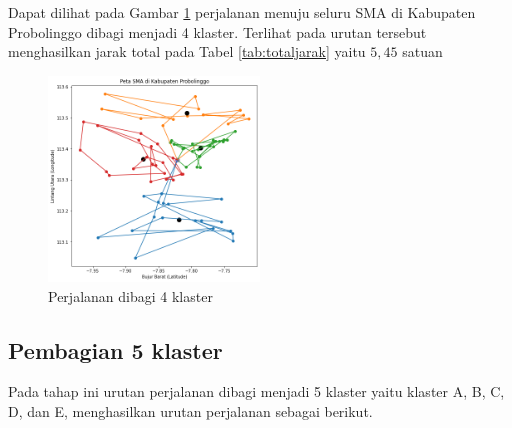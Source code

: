 Dapat dilihat pada Gambar \ref{fig:hasil_mtsp4} perjalanan menuju seluru SMA di Kabupaten Probolinggo dibagi menjadi 4 klaster. Terlihat pada urutan tersebut menghasilkan jarak total pada Tabel \ref{tab:totaljarak} yaitu $5,45$ satuan

\begin{figure}[H]
\centering
\includegraphics[width=0.5\textwidth]{Gambar/hasil_mtsp/4}
\caption{Perjalanan dibagi 4 klaster}
\label{fig:hasil_mtsp4}
\end{figure}

\subsection{Pembagian 5 klaster}

Pada tahap ini urutan perjalanan dibagi menjadi 5 klaster yaitu klaster A, B, C, D, dan E, menghasilkan urutan perjalanan sebagai berikut.

